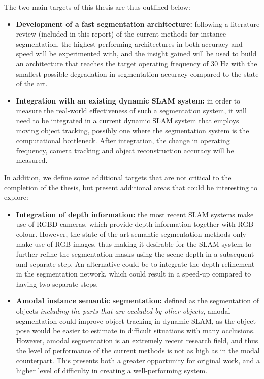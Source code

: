 \documentclass[12pt,twoside]{report}
\begin{document}
The two main targets of this thesis are thus outlined below:

\begin{itemize}
\item \textbf{Development of a fast segmentation architecture:} following a literature review (included in this report) of the current methods for instance segmentation, the highest performing architectures in both accuracy and speed will be experimented with, and the insight gained will be used to build an architecture that reaches the target operating frequency of 30 Hz with the smallest possible degradation in segmentation accuracy compared to the state of the art.
\item \textbf{Integration with an existing dynamic SLAM system:} in order to measure the real-world effectiveness of such a segmentation system, it will need to be integrated in a current dynamic SLAM system that employs moving object tracking, possibly one where the segmentation system is the computational bottleneck. After integration, the change in operating frequency, camera tracking and object reconstruction accuracy will be measured.
\end{itemize}

In addition, we define some additional targets that are not critical to the completion of the thesis, but present additional areas that could be interesting to explore:

\begin{itemize}
\item \textbf{Integration of depth information:} the most recent SLAM systems make use of RGBD cameras, which provide depth information together with RGB colour. However, the state of the art semantic segmentation methods only make use of RGB images, thus making it desirable for the SLAM system to further refine the segmentation masks using the scene depth in a subsequent and separate step. An alternative could be to integrate the depth refinement in the segmentation network, which could result in a speed-up compared to having two separate steps.
\item \textbf{Amodal instance semantic segmentation:} defined as the segmentation of objects \textit{including the parts that are occluded by other objects}, amodal segmentation could improve object tracking in dynamic SLAM, as the object pose would be easier to estimate in difficult situations with many occlusions. However, amodal segmentation is an extremely recent research field, and thus the level of performance of the current methods is not as high as in the modal counterpart. This presents both a greater opportunity for original work, and a higher level of difficulty in creating a well-performing system.
\end{itemize}
\end{document}
